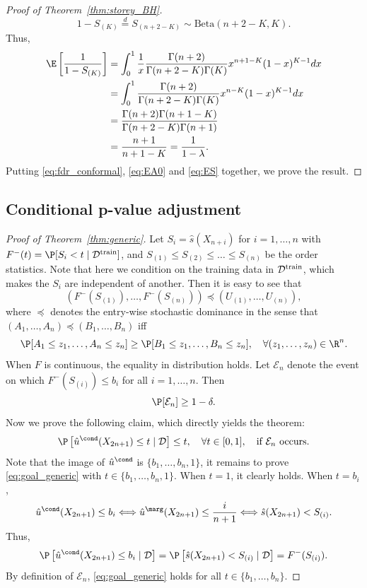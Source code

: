 \begin{proof}[Proof of Theorem~\ref{thm:storey_BH}]
\[1 - S_{(K)}\stackrel{d}{=} S_{(n + 2 - K)}\sim \mathrm{Beta}(n + 2 - K, K).\]
Thus,
\begin{align}
  \E\left[\frac{1}{1 - S_{(K)}}\right]
  &= \int_{0}^{1}\frac{1}{x}\frac{\Gamma(n + 2)}{\Gamma(n + 2 - K)\Gamma(K)}x^{n + 1 - K}(1 - x)^{K - 1}dx\nonumber\\
  & = \int_{0}^{1}\frac{\Gamma(n + 2)}{\Gamma(n + 2 - K)\Gamma(K)}x^{n - K}(1 - x)^{K - 1}dx\nonumber\\
  & = \frac{\Gamma(n + 2)\Gamma(n + 1 - K)}{\Gamma(n + 2 - K)\Gamma(n + 1)}\nonumber\\
  & = \frac{n + 1}{n + 1 - K} = \frac{1}{1 - \lambda}.\label{eq:ES}
\end{align}
Putting \eqref{eq:fdr_conformal}, \eqref{eq:EA0} and \eqref{eq:ES} together, we prove the result.
\end{proof}

\subsection{Conditional p-value adjustment}

\begin{proof}[Proof of Theorem~\ref{thm:generic}]
Let $S_{i} = \hat{s}(X_{n+i})$ for $i = 1, \ldots, n$ with $F^{-}(t) = \P[S_{i} < t\mid \mathcal{D}^\textnormal{train}]$, and $S_{(1)}\le S_{(2)}\le \ldots \le S_{(n)}$ be the order statistics. Note that here we condition on the training data in $\mathcal{D}^\textnormal{train}$, which makes the $S_{i}$ are independent of another. Then it is easy to see that
\[(F^{-}(S_{(1)}), \ldots, F^{-}(S_{(n)}))\preceq (U_{(1)}, \ldots, U_{(n)}),\]
where $\preceq$ denotes the entry-wise stochastic dominance in the sense that $(A_1, \ldots, A_n) \preceq (B_1, \ldots, B_n)$ iff
\[\P[A_1 \le z_1, \ldots, A_n \le z_n] \ge \P[B_1 \le z_1, \ldots, B_n \le z_n], \quad \forall (z_1, \ldots, z_n)\in \R^n.\]
When $F$ is continuous, the equality in distribution holds. Let $\mathcal{E}_{n}$ denote the event on which $F^-(S_{(i)})\le b_{i}$ for all $i = 1, \ldots, n$. Then
\[\P[ \mathcal{E}_{n}] \ge 1 - \delta.\]
Now we prove the following claim, which directly yields the theorem:
\begin{equation}\label{eq:goal_generic}
\P\left[\hat{u}^\cond(X_{2n+1})\le t\mid \mathcal{D}\right]\le t, \quad \forall t\in [0, 1], \quad \text{if } \mathcal{E}_{n} \text{ occurs}.
\end{equation}
Note that the image of $\hat{u}^\cond$ is $\{b_1, \ldots, b_n, 1\}$, it remains to prove \eqref{eq:goal_generic} with $t \in \{b_1, \ldots, b_n, 1\}$. When $t = 1$, it clearly holds. When $t = b_i$,
\[\hat{u}^\cond(X_{2n+1})\le b_i\Longleftrightarrow \hat{u}^\marg(X_{2n+1})\le \frac{i}{n+1}\Longleftrightarrow \hat{s}(X_{2n+1}) < S_{(i)}.\]
Thus,
\[\P\left[\hat{u}^\cond(X_{2n+1})\le b_i\mid \mathcal{D}\right] = \P\left[\hat{s}(X_{2n+1}) < S_{(i)}\mid \mathcal{D}\right] = F^-(S_{(i)}).\]
By definition of $\mathcal{E}_{n}$, \eqref{eq:goal_generic} holds for all $t\in \{b_1, \ldots, b_n\}$.

\end{proof}

